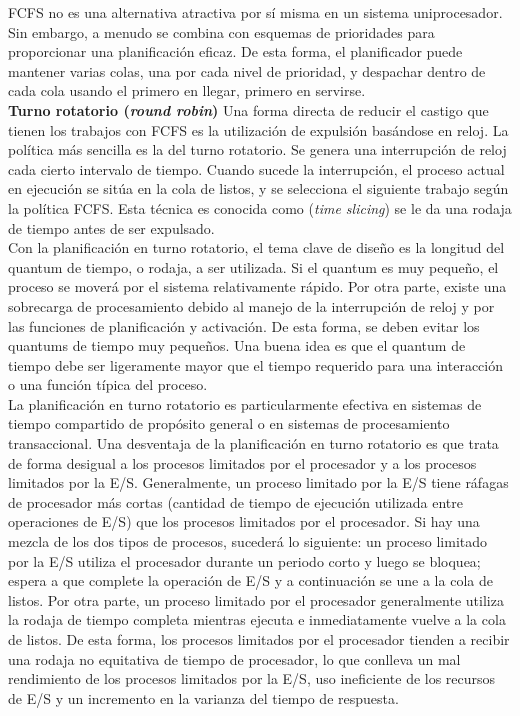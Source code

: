\documentclass{article}
\begin{document}
				FCFS no es una alternativa atractiva por sí misma en un sistema uniprocesador. Sin embargo, a menudo se combina con esquemas de prioridades para proporcionar una planificación eficaz. De esta forma, el planificador puede mantener varias colas, una por cada nivel de prioridad, y despachar dentro de cada cola usando el primero en llegar, primero en servirse. \\
				
				\textbf{Turno rotatorio (\textit{round robin})} Una forma directa de reducir el castigo que tienen los trabajos con FCFS es la utilización de expulsión basándose en reloj. La  política más sencilla es la del turno rotatorio. Se genera una interrupción de reloj cada cierto intervalo de tiempo. Cuando sucede la interrupción, el proceso actual en ejecución se sitúa en la cola de listos, y se selecciona el siguiente trabajo según la política FCFS. Esta técnica es conocida como (\textit{time slicing}) se le da una rodaja de tiempo antes de ser expulsado. \\
				
				Con la planificación en turno rotatorio, el tema clave de diseño es la longitud del quantum de tiempo, o rodaja, a ser utilizada. Si el quantum es muy pequeño, el proceso se moverá por el sistema relativamente rápido. Por otra parte, existe una sobrecarga de procesamiento debido al manejo de la interrupción de reloj y por las funciones de planificación y activación. De esta forma, se deben evitar los quantums de tiempo muy pequeños. Una buena idea es que el quantum de tiempo debe ser ligeramente mayor que el tiempo requerido para una interacción o una función típica del proceso. \\
				
				La planificación en turno rotatorio es particularmente efectiva en sistemas de tiempo compartido de propósito general o en sistemas de procesamiento transaccional. Una desventaja de la planificación en turno rotatorio es que trata de forma desigual a los procesos limitados por el procesador y a los procesos limitados por la E/S. Generalmente, un proceso limitado por la E/S tiene ráfagas de procesador más cortas (cantidad de tiempo de ejecución utilizada entre operaciones de E/S) que los procesos limitados por el procesador. Si hay una mezcla de los dos tipos de procesos, sucederá lo siguiente: un proceso limitado por la E/S utiliza el procesador durante un periodo corto y luego se bloquea; espera a que complete la operación de E/S y a continuación se une a la cola de listos. Por otra parte, un proceso limitado por el procesador generalmente utiliza la rodaja de tiempo completa mientras ejecuta e inmediatamente vuelve a la cola de listos. De esta forma, los procesos limitados por el procesador tienden a recibir una rodaja no equitativa de tiempo de procesador, lo que conlleva un mal rendimiento de los procesos limitados por la E/S, uso ineficiente de los recursos de E/S y un incremento en la varianza del tiempo de respuesta. \\
				
\end{document}
